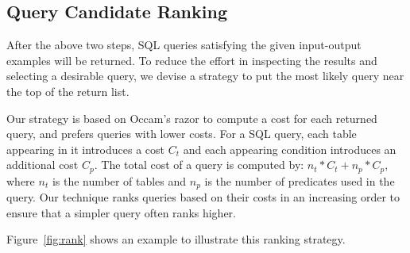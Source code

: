 \subsection{Query Candidate Ranking}
\label{sec:ranking}

After the above two steps, SQL queries satisfying the given input-output examples
will be returned. To reduce the effort in inspecting the
results and selecting a desirable query, we devise a strategy
to put the most likely query near the top of the return list.

Our strategy is based on Occam's razor to
compute a cost for each returned query, and prefers
queries with lower costs.
For a SQL query, each table appearing in it introduces a cost $C_t$ and each appearing condition 
introduces an additional cost $C_p$. The total cost of a query is
computed by: $n_t*C_t+n_p*C_p$, where
$n_t$ is the number of tables and $n_p$ is the number of predicates used in the query. Our technique 
ranks queries based on their costs in an increasing order to ensure that a simpler query often ranks higher.

Figure~\ref{fig:rank} shows an example to illustrate this ranking strategy.


